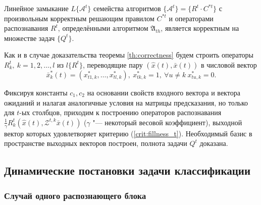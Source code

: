 \begin{Theorem}
	\label{th:correctness_t}
	Линейное замыкание $L\{\mathcal A^t\}$ семейства алгоритмов $\{\mathcal A^t\}=\{R^t\cdot C^{*t}\}$ с произвольным корректным решающим правилом $C^{*t}$ и операторами распознавания $R^t$, определёнными алгоритмом $\mathfrak A_{th}$, является корректным на множестве задач $\{Q^t\}$.
\end{Theorem}

\begin{Proof}
	Как и в случае доказательства теоремы \ref{th:correctness} будем строить операторы $R_k^t,\ k=1,2,\dots,l$ из $l\{R^t\}$, переводящие пару $(\hat x(t), \bar x(t))$ в числовой вектор
	\begin{equation}\label{crit:fillness_t}
		\bar x_k^*(t)=(x_{t1,k}^*,\dots,x_{tl,k}^*),\ x_{tk,k}^*=1,\ \forall u\neq k\ x_{tu,k}^*=0.
	\end{equation}
	
	Фиксируя константы $c_1,c_2$ на основании свойств входного вектора и вектора ожиданий и налагая аналогичные условия на матрицы предсказания, но только для $t$-ых столбцов, приходим к построению операторов распознавания $\frac{1}{\gamma}R_k^t(\hat x(t),\mathcal Z^{t,k} \bar x(t))$ ($\gamma$ "--- некоторый весовой коэффициент), выходной вектор которых удовлетворяет критерию (\ref{crit:fillness_t}). Необходимый базис в пространстве выходных векторов построен, полнота задачи $Q^t$ доказана.
\end{Proof}

\subsection{Динамические постановки задачи классификации}

\subsubsection{Случай одного распознающего блока}

